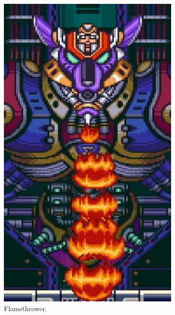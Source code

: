 \begin{figure}[htp]
\begin{subfigure}{0.85\linewidth}
	\end{subfigure}
	\begin{subfigure}[t]{0.24\linewidth}
		\centering
		\includegraphics[width=\linewidth]{figures/X1/Sigma_stages/WolfSigma_fire.jpg}
		\caption{Flamethrower.}
	\end{subfigure}
	\begin{subfigure}[t]{0.3\linewidth}
		\centering

\end{subfigure}
\end{figure}
